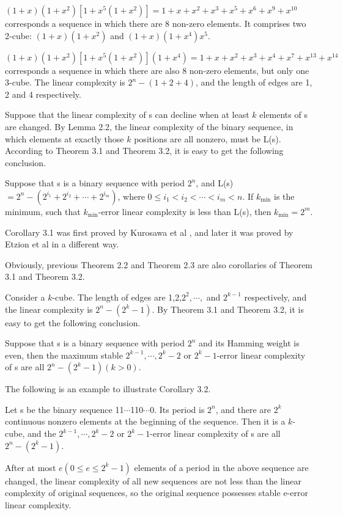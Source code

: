 \documentclass[10pt,conference,twocolumn]{IEEEtran}
\begin{document}
$(1+x)(1+x^2)[1+x^5(1+x^2)]=1+x+x^2+x^3+x^5+x^6+x^9+x^{10}$
corresponds a sequence in which there are 8 non-zero elements. It
comprises two 2-cube: $(1+x)(1+x^2)$ and $(1+x)(1+x^4)x^5$.

 $(1+x)(1+x^2)[1+x^5(1+x^2)](1+x^4)=1+x+x^2+x^3+x^4+x^7+x^{13}+x^{14}$ corresponds
a sequence in which there are also 8 non-zero elements, but only one
3-cube. The linear complexity is $2^n-(1+2+4)$, and the length of
edges are 1, 2 and 4 respectively.

Suppose that the linear complexity of s can decline when at least
$k$ elements of s are changed. By Lemma 2.2, the linear complexity
of the binary sequence, in which elements at exactly those $k$
positions are all nonzero, must be L(s). According to Theorem 3.1
and Theorem 3.2, it is easy to get the following conclusion.


 Suppose that s is a binary sequence
with period  $2^n$, and L(s)$=2^n-(2^{i_1}+2^{i_2}+\cdots+2^{i_m})$,
where  $0\le i_1< i_2<\cdots<i_m<n$. If $k_{\min}$ is the minimum,
such that $k_{\min}$-error linear complexity is less than L(s), then
$k_{\min}=2^m$.

Corollary 3.1 was first proved by Kurosawa et al \cite{Kurosawa},
and later it was proved by Etzion et al \cite{Etzion} in a different
way.

Obviously, previous Theorem 2.2 and Theorem 2.3 are also corollaries
of Theorem 3.1 and Theorem 3.2.

Consider a $k$-cube. The length of edges are 1,2,$2^2,\cdots,$ and
$2^{k-1}$ respectively, and the linear complexity is $2^n-(2^k-1)$.
By Theorem 3.1 and Theorem 3.2, it is easy to get the following
conclusion.

 Suppose that s is a binary sequence
with period  $2^n$ and its Hamming weight is even, then the maximum
stable $2^{k-1},\cdots, 2^k-2$ or $2^k-1$-error linear complexity of
s are all $2^n-(2^k-1)(k>0)$.

The following is an example to illustrate Corollary 3.2.

Let s be the binary sequence 11$\cdots$110$\cdots$0. Its period is
$2^n$, and there are $2^k$ continuous nonzero elements at the
beginning of the sequence. Then it is a $k$-cube, and the
$2^{k-1},\cdots, 2^k-2$ or $2^k-1$-error linear complexity of s are
all $2^n-(2^k-1)$.

After at most $e(0\le e\le 2^k-1)$ elements of a period in the above
sequence are changed, the linear complexity of all new sequences are
not less than the linear complexity of original sequences, so the
original sequence possesses stable e-error linear complexity.
\end{document}

